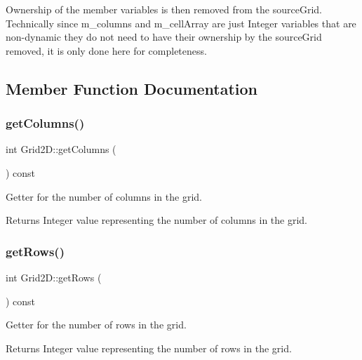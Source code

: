 Ownership of the member variables is then removed from the source\+Grid. Technically since m\+\_\+columns and m\+\_\+cell\+Array are just Integer variables that are non-\/dynamic they do not need to have their ownership by the source\+Grid removed, it is only done here for completeness.

\subsection{Member Function Documentation}
\mbox{\label{class_grid2_d_a9c938ac6bc35ad0be047b06afb3ba59b}} 
\subsubsection{\texorpdfstring{get\+Columns()}{getColumns()}}
{\footnotesize\ttfamily int Grid2\+D\+::get\+Columns (\begin{DoxyParamCaption}{ }\end{DoxyParamCaption}) const}



Getter for the number of columns in the grid. 

\begin{DoxyReturn}{Returns}
Integer value representing the number of columns in the grid. 
\end{DoxyReturn}
\mbox{\label{class_grid2_d_a99b9cf77d65fdf321f0d1dab6720f68c}} 
\subsubsection{\texorpdfstring{get\+Rows()}{getRows()}}
{\footnotesize\ttfamily int Grid2\+D\+::get\+Rows (\begin{DoxyParamCaption}{ }\end{DoxyParamCaption}) const}



Getter for the number of rows in the grid. 

\begin{DoxyReturn}{Returns}
Integer value representing the number of rows in the grid. 
\end{DoxyReturn}
\mbox{\label{class_grid2_d_ae96a92e2933a30a76b3dc22c6c075371}} 
